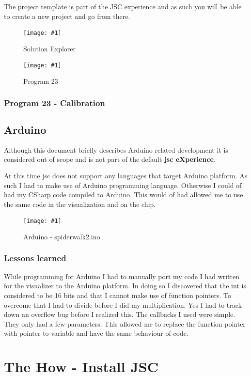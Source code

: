 \documentclass[12pt,leqno]{book}
\newcommand{\png}[1]{\texttt{[image: \#1]}}
\newcommand{\figpng}[2]{\begin{figure}[htb]\centering\png{#1}\caption{#2}\end{figure}}
\begin{document}
The project template is part of the JSC experience and as such you will be able to create a new project and go from there.



\figpng{Images/SpiderModel_-_Microsoft_Visual_Studio-2012-03-14_15.39.19}
{Solution Explorer}

\figpng{Images/A_string_from_JavaScript._-_Google_Chrome-2012-03-14_16.12.04}
{Program 23}


\subsection{Program 23 - Calibration}





\section{Arduino}
Although this document briefly describes Arduino related development it is considered out of scope and is not part of the default \textbf{jsc eXperience}.

At this time jsc does not support any languages that target Arduino platform. As such I had to make use of Arduino programming language. Otherwise I could of had my CSharp code compiled to Arduino. This would of had allowed me to use the same code in the visualization and on the chip.

\figpng{Images/spiderwalk2__Arduino_1.0-2012-03-14_18.04.43}
{Arduino - spiderwalk2.ino}


\subsection{Lessons learned}
While programming for Arduino I had to manually port my code I had written for the visualizer to the Arduino platform. In doing so I discovered that the int is considered to be 16 bits and that I cannot make use of function pointers. To overcome that I had to divide before I did my multiplication. Yes I had to track down an overflow bug before I realized this. The callbacks I used were simple. They only had a few parameters. This allowed me to replace the function pointer with pointer to variable and have the same behaviour of code.




\chapter{The How - Install JSC}
\end{document}
